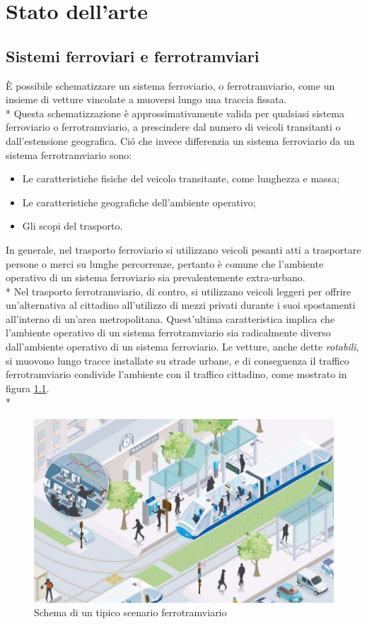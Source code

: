 \chapter{Stato dell'arte}
\section{Sistemi ferroviari e ferrotramviari}
\`E possibile schematizzare un sistema ferroviario, o ferrotramviario, come un insieme di vetture vincolate a muoversi lungo una traccia fissata.\\*
Questa schematizzazione \`e approssimativamente valida per qualsiasi sistema ferroviario o ferrotramviario, a prescindere dal numero di veicoli transitanti o dall'estensione geografica. Ci\'o che invece differenzia un sistema ferroviario da un sistema ferrotramviario sono:
\begin{itemize}
		\item Le caratteristiche fisiche del veicolo transitante, come lunghezza e massa;
		\item Le caratteristiche geografiche dell'ambiente operativo;
		\item Gli scopi del trasporto.
\end{itemize}
In generale, nel trasporto ferroviario si utilizzano veicoli pesanti atti a trasportare persone o merci su lunghe percorrenze, pertanto \`e comune che l'ambiente operativo di un sistema ferroviario sia prevalentemente extra-urbano.\\*
Nel trasporto ferrotramviario, di contro, si utilizzano veicoli leggeri per offrire un'alternativa al cittadino all'utilizzo di mezzi privati durante i suoi spostamenti all'interno di un'area metropolitana. Quest'ultima caratteristica implica che l'ambiente operativo di un sistema ferrotramviario sia radicalmente diverso dall'ambiente operativo di un sistema ferroviario. Le vetture, anche dette \emph{rotabili}, si muovono lungo tracce installate su strade urbane, e di conseguenza il traffico ferrotramviario condivide l'ambiente con il traffico cittadino, come mostrato in figura \ref{fig:tramschema}.\\*
\begin{figure}[h]
		\centering
		\includegraphics[width=0.7\linewidth]{img/twschema}
		\caption{Schema di un tipico scenario ferrotramviario}
		\label{fig:tramschema}
\end{figure}
